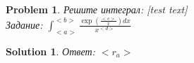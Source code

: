 \documentclass{article}%
\newtheorem*{problem*}{Problem}%
\newtheorem*{solution*}{Solution}%
\begin{document}
\begin{problem*}Решите интеграл: [test text] \\Задание: $ \int_{<a>}^{<b>} \frac{\exp(\frac{<c>}{x})dx}{x^{<d>}} $\end{problem*}

\begin{solution*}
Ответ: $<r_a>$
\end{solution*}
\end{document}
